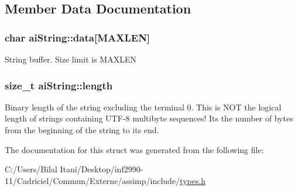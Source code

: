\subsection{Member Data Documentation}
\subsubsection[{\texorpdfstring{data}{data}}]{\setlength{\rightskip}{0pt plus 5cm}char ai\+String\+::data\mbox{[}{\bf M\+A\+X\+L\+EN}\mbox{]}}\hypertarget{structai_string_aa90b1da7d347a3dcca0a95061e6ea41d}{}\label{structai_string_aa90b1da7d347a3dcca0a95061e6ea41d}
String buffer. Size limit is M\+A\+X\+L\+EN 
\subsubsection[{\texorpdfstring{length}{length}}]{\setlength{\rightskip}{0pt plus 5cm}size\+\_\+t ai\+String\+::length}\hypertarget{structai_string_a7d77c2031ff0340746aa046f7fbcf313}{}\label{structai_string_a7d77c2031ff0340746aa046f7fbcf313}
Binary length of the string excluding the terminal 0. This is N\+OT the logical length of strings containing U\+T\+F-\/8 multibyte sequences! It\textquotesingle{}s the number of bytes from the beginning of the string to its end. 

The documentation for this struct was generated from the following file\+:\begin{DoxyCompactItemize}
\item 
C\+:/\+Users/\+Bilal Itani/\+Desktop/inf2990-\/11/\+Cadriciel/\+Commun/\+Externe/assimp/include/\hyperlink{types_8h}{types.\+h}\end{DoxyCompactItemize}
